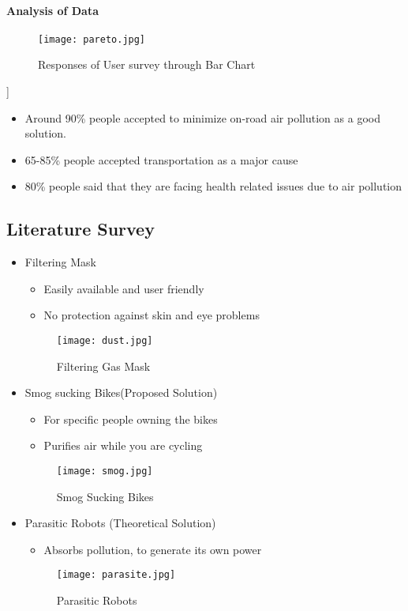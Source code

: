 \documentclass[12pt]{article}
\begin{document}
\paragraph{Analysis of Data}
\begin{figure}[!htb]
\centering
\texttt{[image: pareto.jpg]}
\caption{\label{fig:}Responses of User survey through Bar Chart}
\end{figure}
]
\begin{itemize}
\item Around 90\% people accepted to minimize on-road air pollution as a good solution.
\item 65-85\% people accepted transportation as a major cause
\item 80\% people said that they are facing health related issues due to air pollution
\end{itemize}

\subsection{Literature Survey}
\begin{itemize}
\item Filtering Mask
\begin{itemize}
\item Easily available and user friendly
\item No protection against skin and eye problems
\end{itemize}

\begin{figure}[!htb]
\centering
\texttt{[image: dust.jpg]}
\caption{\label{fig:}Filtering Gas Mask}
\end{figure}

\item Smog sucking Bikes(Proposed Solution)
\begin{itemize}
\item For specific people owning the bikes
\item Purifies air while you are cycling
\end{itemize}


\begin{figure}[!htb]
\centering
\texttt{[image: smog.jpg]}
\caption{\label{fig:}Smog Sucking Bikes}
\end{figure}

\item Parasitic Robots (Theoretical Solution)

\begin{itemize}
\item Absorbs pollution, to generate its own power
\end{itemize}

\begin{figure}[!htb]
\centering
\texttt{[image: parasite.jpg]}
\caption{\label{fig:}Parasitic Robots}
\end{figure}

\end{itemize}
\end{document}
